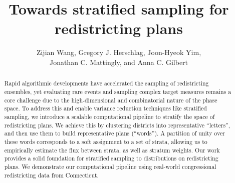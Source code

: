 \documentclass{amsart}
\title{Towards stratified sampling for redistricting plans}
\author[ZW, GH, JY, JM, AG]{Zijian Wang, Gregory J. Herschlag, Joon-Hyeok Yim,\\ Jonathan C. Mattingly, and Anna C. Gilbert}
\begin{document}
\linenumbers

\begin{abstract}
Rapid algorithmic developments have accelerated the sampling of redistricting ensembles, yet evaluating rare events and sampling complex target measures remains a core challenge due to the high-dimensional and combinatorial nature of the phase space.
To address this and enable variance reduction techniques like stratified sampling, we introduce a scalable computational pipeline to stratify the space of redistricting plans.
We achieve this by clustering districts into representative ``letters'', and then use them to build representative plans (``words'').
A partition of unity over these words corresponds to a soft assignment to a set of strata, allowing us to empirically estimate the flux between strata, as well as stratum weights.
Our work provides a solid foundation for stratified sampling to distributions on redistricting plans.
We demonstrate our computational pipeline using real-world congressional redistricting data from Connecticut.
\end{abstract}

\maketitle








\newpage


\end{document}
